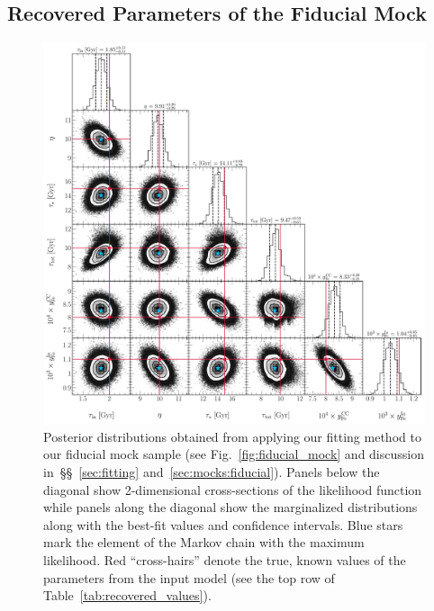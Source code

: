 \documentclass[foo.tex]{subfiles}
\begin{document}
\subsection{Recovered Parameters of the Fiducial Mock}
\label{sec:mocks:recovered}

\begin{figure}
\centering
\includegraphics[scale = 0.42]{fiducial_512k.pdf}
\caption{
Posterior distributions obtained from applying our fitting method to our
fiducial mock sample (see Fig.~\ref{fig:fiducial_mock} and discussion
in~\S\S~\ref{sec:fitting} and~\ref{sec:mocks:fiducial}).
Panels below the diagonal show 2-dimensional cross-sections of the likelihood
function while panels along the diagonal show the marginalized distributions
along with the best-fit values and confidence intervals.
Blue stars mark the element of the Markov chain with the maximum likelihood.
Red ``cross-hairs'' denote the true, known values of the parameters from the
input model (see the top row of Table~\ref{tab:recovered_values}).
}
\label{fig:fiducial_mock_corner}
\end{figure}
\end{document}
